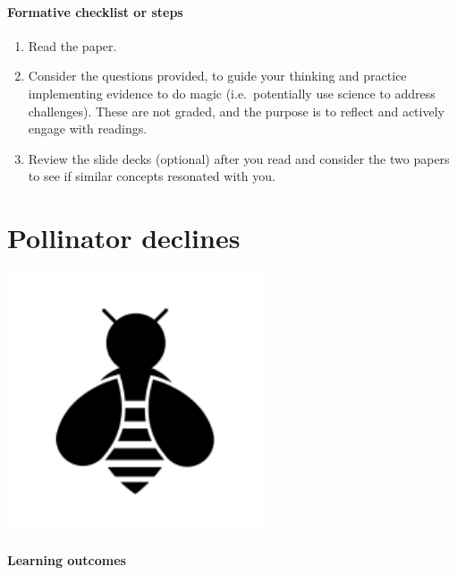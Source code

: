 \documentclass[
]{book}
\providecommand{\tightlist}{%
  \setlength{\itemsep}{0pt}\setlength{\parskip}{0pt}}
\begin{document}
\hypertarget{formative-checklist-or-steps}{%
\subsubsection*{Formative checklist or steps}\label{formative-checklist-or-steps}}

\begin{enumerate}
\def\labelenumi{\arabic{enumi}.}
\tightlist
\item
  Read the paper.\\
\item
  Consider the questions provided, to guide your thinking and practice implementing evidence to do magic (i.e.~potentially use science to address challenges). These are not graded, and the purpose is to reflect and actively engage with readings.\\
\item
  Review the slide decks (optional) after you read and consider the two papers to see if similar concepts resonated with you.
\end{enumerate}

\hypertarget{pollinators}{%
\chapter{Pollinator declines}\label{pollinators}}

\includegraphics[width=3in,height=\textheight]{./bee.png}

\hypertarget{learning-outcomes-2}{%
\subsubsection*{Learning outcomes}\label{learning-outcomes-2}}
\end{document}
